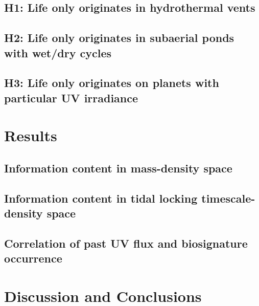 \documentclass[twocolumn]{aastex631}
\begin{document}
\subsection{H1: Life only originates in hydrothermal vents}

\subsection{H2: Life only originates in subaerial ponds with wet/dry cycles}

\subsection{H3: Life only originates on planets with particular UV irradiance}



\section{Results}
\label{sec:results}
\subsection{Information content in mass-density space}

\subsection{Information content in tidal locking timescale-density space}

\subsection{Correlation of past UV flux and biosignature occurrence}

\section{Discussion and Conclusions}
\label{sec:discussion}



\end{document}
